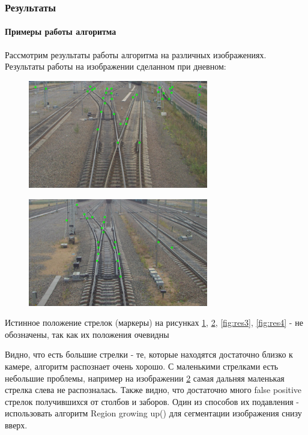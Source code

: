 \newpage
\subsubsection{Результаты}
\paragraph{Примеры работы алгоритма}
Рассмотрим результаты работы алгоритма на различных изображениях.
\newline
Результаты работы на изображении сделанном при дневном:
\begin{figure}[!h]
	\centering
	\includegraphics[width=0.7\textwidth]{pictures/res1.png}
	\caption{}
	\label{fig:res1}
\end{figure}
\begin{figure}[!h]
	\centering
	\includegraphics[width=0.7\textwidth]{pictures/res2.png}
	\caption{}
	\label{fig:res2}
\end{figure}
\newpage

Истинное положение стрелок (маркеры) на рисунках \ref{fig:res1}, \ref{fig:res2}, \ref{fig:res3}, \ref{fig:res4} - не обозначены, так как их положения очевидны

Видно, что есть большие стрелки - те, которые находятся достаточно близко к камере, алгоритм распознает очень хорошо. С маленькими стрелками есть небольшие проблемы, например на изображении \ref{fig:res2} самая дальняя маленькая стрелка слева не распозналась.\newline
Также видно, что достаточно много false positive стрелок получившихся от столбов и заборов. Один из способов их подавления - использовать алгоритм Region growing up(\cite{b:growing_up}) для сегментации изображения снизу вверх.


